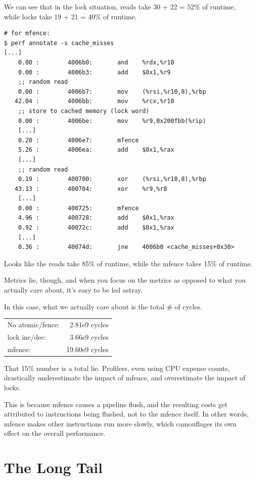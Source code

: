 \documentclass[a4paper]{report}
\begin{document}
We can see that in the lock situation, reads take 30 + 22 = 52\% of runtime,
while locks take 19 + 21 = 40\% of runtime.

{\scriptsize
\begin{lstlisting}
# for mfence:
$ perf annotate -s cache_misses
[...]
    0.00 :        4006b0:       and    %rdx,%r10
    0.00 :        4006b3:       add    $0x1,%r9
    ;; random read
    0.00 :        4006b7:       mov    (%rsi,%r10,8),%rbp
   42.04 :        4006bb:       mov    %rcx,%r10
    ;; store to cached memory (lock word)
    0.00 :        4006be:       mov    %r9,0x200fbb(%rip)
    [...]
    0.20 :        4006e7:       mfence 
    5.26 :        4006ea:       add    $0x1,%rax
    [...]
    ;; random read
    0.19 :        400700:       xor    (%rsi,%r10,8),%rbp
   43.13 :        400704:       xor    %r9,%r8
    [...]
    0.00 :        400725:       mfence 
    4.96 :        400728:       add    $0x1,%rax
    0.92 :        40072c:       add    $0x1,%rax
    [...]
    0.36 :        40074d:       jne    4006b0 <cache_misses+0x30>
\end{lstlisting}
}
Looks like the reads take 85\% of runtime,
while the mfence takes 15\% of runtime.

Metrics lie, though, and when you focus on the metrics as opposed to what you
actually care about, it's easy to be led astray.

In this case, what we actually care about is the total \# of cycles.

    \begin{tabular}{lr}
    No atomic/fence:& 2.81e9 cycles\\
    lock inc/dec: & 3.66e9 cycles\\
    mfence: & 19.60e9 cycles
    \end{tabular}

That 15\% number is a total lie.
Profilers, even using CPU expense counts, drastically underestimate the impact of mfence,
and overestimate the impact of locks.

This is because mfence causes a pipeline flush, and the resulting 
costs get attributed to instructions being flushed, not to the mfence itself. In other
words, mfence makes other instructions run more slowly, which camouflages its own effect
on the overall performance.


\section*{The Long Tail}
\end{document}
